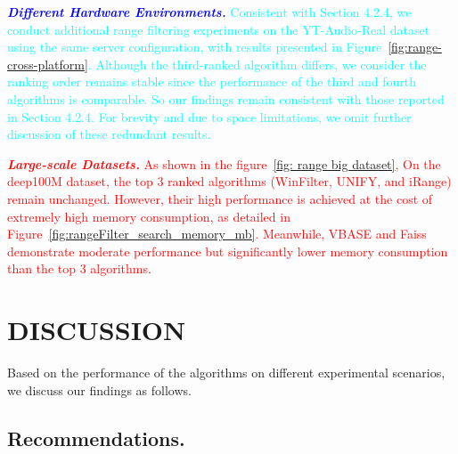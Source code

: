 \documentclass[sigconf, nonacm]{acmart}
\begin{document}
{	\textit{\textbf{\textcolor{blue}{Different Hardware Environments.}}} 
	\textcolor{cyan}{Consistent with Section 4.2.4, we conduct additional range filtering experiments on the YT-Audio-Real dataset using the same server configuration, with results presented in Figure~\ref{fig:range-cross-platform}. Although the third-ranked algorithm differs, we consider the ranking order remains stable since the performance of the third and fourth algorithms is comparable. So our findings remain consistent with those reported in Section 4.2.4. For brevity and due to space limitations, we omit further discussion of these redundant results.}
	
	\textit{\textbf{\textcolor{red}{Large-scale Datasets.}}} \textcolor{red}{As shown in the figure~\ref{fig: range big dataset}, On the deep100M dataset, the top 3 ranked algorithms (WinFilter, UNIFY, and iRange) remain unchanged. However, their high performance is achieved at the cost of extremely high memory consumption, as detailed in Figure~\ref{fig:rangeFilter_search_memory_mb}. Meanwhile, VBASE and Faiss demonstrate moderate performance but significantly lower memory consumption than the top 3 algorithms}.
	
	
	\section{DISCUSSION}
	Based on the performance of the algorithms on different experimental scenarios, we discuss our findings as follows.
	
	
	\subsection{Recommendations.}
	
}
\end{document}
